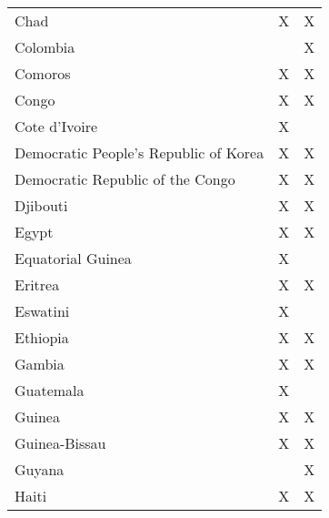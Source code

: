 \begin{table}[htbp]
\begin{tabular}{lcc}
		Chad                                    & \cellcolor[HTML]{E2EFD9}X & \cellcolor[HTML]{E2EFD9}X \\
		Colombia                                &                           & \cellcolor[HTML]{FBE4D5}X \\
		Comoros                                 & \cellcolor[HTML]{E2EFD9}X & \cellcolor[HTML]{E2EFD9}X \\
		Congo                                   & \cellcolor[HTML]{E2EFD9}X & \cellcolor[HTML]{E2EFD9}X \\
		Cote   d'Ivoire                         & \cellcolor[HTML]{FFF2CC}X & \cellcolor[HTML]{FFFFFF}  \\
		Democratic   People's Republic of Korea & \cellcolor[HTML]{E2EFD9}X & \cellcolor[HTML]{E2EFD9}X \\
		Democratic   Republic of the Congo      & \cellcolor[HTML]{E2EFD9}X & \cellcolor[HTML]{E2EFD9}X \\
		Djibouti                                & \cellcolor[HTML]{E2EFD9}X & \cellcolor[HTML]{E2EFD9}X \\
		Egypt                                   & \cellcolor[HTML]{E2EFD9}X & \cellcolor[HTML]{E2EFD9}X \\
		Equatorial   Guinea                     & \cellcolor[HTML]{FFF2CC}X &                           \\
		Eritrea                                 & \cellcolor[HTML]{E2EFD9}X & \cellcolor[HTML]{E2EFD9}X \\
		Eswatini                                & \cellcolor[HTML]{FFF2CC}X &                           \\
		Ethiopia                                & \cellcolor[HTML]{E2EFD9}X & \cellcolor[HTML]{E2EFD9}X \\
		Gambia                                  & \cellcolor[HTML]{E2EFD9}X & \cellcolor[HTML]{E2EFD9}X \\
		Guatemala                               & \cellcolor[HTML]{FFF2CC}X &                           \\
		Guinea                                  & \cellcolor[HTML]{E2EFD9}X & \cellcolor[HTML]{E2EFD9}X \\
		Guinea-Bissau                           & \cellcolor[HTML]{E2EFD9}X & \cellcolor[HTML]{E2EFD9}X \\
		Guyana                                  &                           & \cellcolor[HTML]{FBE4D5}X \\
		Haiti                                   & \cellcolor[HTML]{E2EFD9}X & \cellcolor[HTML]{E2EFD9}X \\

\end{tabular}
\end{table}

